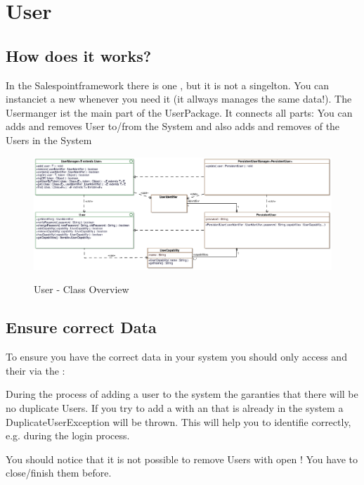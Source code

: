\section{User}

\subsection{How does it works?}

In the Salespointframework there is one , but it is not a singelton. You can instanciet a new
 whenever you need it (it allways manages the same data!).
The Usermanger ist the main part of the UserPackage. It connects all parts:
You can adds and removes User to/from the System and also adds and removes  of the Users in the System

\begin{figure}[ht]
	\centering
  \includegraphics[width=1.0\textwidth]{images/User_Overview.eps}
	\label{user_overview}
	\caption{User - Class Overview}
\end{figure}

\subsection{Ensure correct Data}
To ensure you have the correct data in your system you should only access  and their  via the :

During the process of adding a user to the system the  garanties that there will be no duplicate Users. If you try to add a  with an  that is already in the system a DuplicateUserException will be thrown. This will help you to identifie  correctly, e.g. during the login process.

You should notice that it is not possible to remove Users with open ! You have to close/finish them before.

